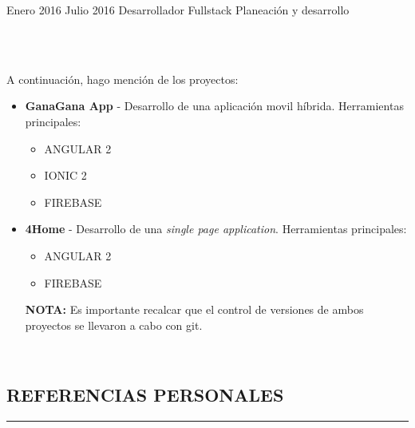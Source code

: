 \documentclass[letterpaper]{twentysecondcv} %
\begin{document}
\begin{twenty} %
\twentyitem
    	{Enero 2016}
		{Julio 2016}
        {Desarrollador Fullstack}
        {Planeación y desarrollo}
        {
        \begin{center}
  			       \\
  			       \\
		\end{center}
        \vspace{.5cm}
        A continuación, hago mención de los proyectos:
        }
        {\begin{itemize}
        \item {
        	\textbf{GanaGana App} - Desarrollo de una aplicación movil híbrida. Herramientas principales: 
        	\begin{itemize}
        		\item ANGULAR 2
        		\item IONIC 2
        		\item FIREBASE
        	\end{itemize}
        } 
        \item {
        	\textbf{4Home} - Desarrollo de una \textit{single page application}. Herramientas principales: 
        	\begin{itemize}
        		\item ANGULAR 2
        		\item FIREBASE
        	\end{itemize}
        } \begin{flushleft}
\vspace{.5cm}
\textbf{NOTA:} Es importante recalcar que el control de versiones de ambos proyectos se llevaron a cabo con git.
\end{flushleft}
        \end{itemize}}

        \\
        
\end{twenty}
\vspace{.5cm}

\newpage
\makesidebarcommon %
\begin{center}
\section{REFERENCIAS PERSONALES}
\end{center}
\noindent\rule{1\textwidth}{1.4pt}
\end{document}
